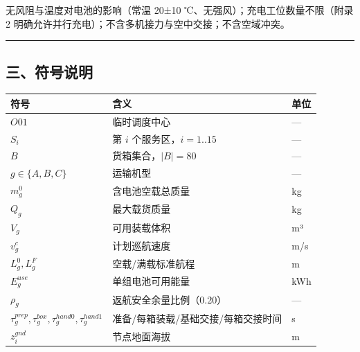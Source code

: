 \documentclass[
  10.5pt,
]{extarticle}
\newcounter{none} %
\begin{document}
无风阻与温度对电池的影响（常温 20±10 ℃、无强风）；充电工位数量不限（附录
2 明确允许并行充电）；不含多机接力与空中交接；不含空域冲突。

\begin{center}\rule{0.5\linewidth}{0.5pt}\end{center}

\subsection{三、符号说明}\label{ux4e09ux7b26ux53f7ux8bf4ux660e}

{\def\LTcaptype{none} %
\begin{longtable}[]{@{}
  >{\raggedright\arraybackslash}p{}
  >{\raggedright\arraybackslash}p{}
  >{\raggedright\arraybackslash}p{}@{}}
\toprule\noalign{}
\begin{minipage}[b]{\linewidth}\raggedright
符号
\end{minipage} & \begin{minipage}[b]{\linewidth}\raggedright
含义
\end{minipage} & \begin{minipage}[b]{\linewidth}\raggedright
单位
\end{minipage} \\
\midrule\noalign{}
\endhead
\bottomrule\noalign{}
\endlastfoot
\(O01\) & 临时调度中心 & --- \\
\(S_i\) & 第 \(i\) 个服务区，\(i=1..15\) & --- \\
\(B\) & 货箱集合，\(\lvert B\rvert=80\) & --- \\
\(g\in\{A,B,C\}\) & 运输机型 & --- \\
\(m^0_g\) & 含电池空载总质量 & kg \\
\(Q_g\) & 最大载货质量 & kg \\
\(V_g\) & 可用装载体积 & m³ \\
\(v^c_g\) & 计划巡航速度 & m/s \\
\(L^0_g,L^F_g\) & 空载/满载标准航程 & m \\
\(E^{use}_g\) & 单组电池可用能量 & kWh \\
\(\rho_g\) & 返航安全余量比例（0.20） & --- \\
\(\tau^{prep}_g,\tau^{box}_g,\tau^{hand0}_g,\tau^{hand1}_g\) &
准备/每箱装载/基础交接/每箱交接时间 & s \\
\(z^{gnd}_i\) & 节点地面海拔 & m \\

\end{longtable}}
\end{document}
